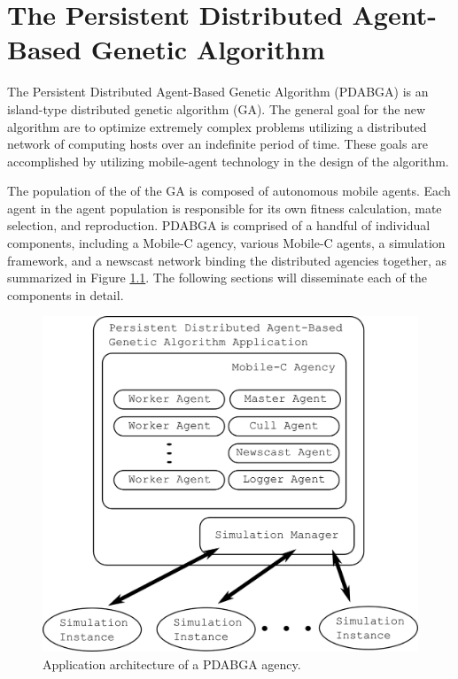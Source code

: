 \chapter{The Persistent Distributed Agent-Based Genetic Algorithm}
  The Persistent Distributed Agent-Based Genetic Algorithm (PDABGA) 
    is an island-type distributed genetic algorithm (GA). 
  The general goal for the new algorithm are to optimize extremely
    complex problems utilizing a distributed network of computing hosts
    over an indefinite period of time.
  These goals are accomplished by utilizing mobile-agent technology in the 
    design of the algorithm.

  The population of the of the GA is composed of autonomous mobile agents.
  Each agent in the agent population is responsible for its own fitness
    calculation, mate selection, and reproduction.
  PDABGA is
    comprised of a handful of individual components, including a Mobile-C
    agency, various Mobile-C agents, a simulation framework, and a
    newscast network binding the distributed agencies together, as summarized
    in Figure \ref{fig:pdabga_architecture}.
  The following sections will disseminate each of the components in detail.

  \begin{figure}[!ht]
  \begin{center}
     \includegraphics[width=5in]{figures/application_architecture}
  \end{center}
  \caption{\label{fig:pdabga_architecture}Application architecture of a PDABGA agency.}
  \end{figure}


